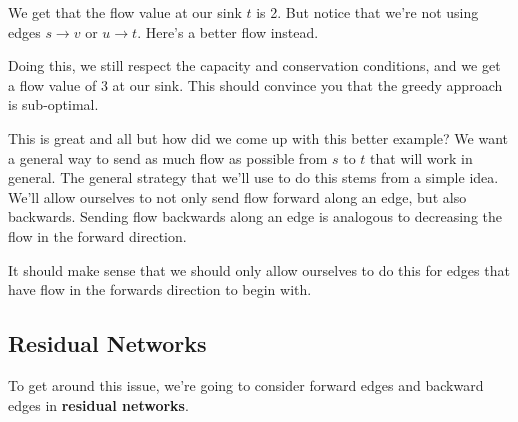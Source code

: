 \documentclass[12pt]{article}
\newcommand{\fc}[2]{
  \blue{#1}/\red{#2}
}
\begin{document}
  We get that the flow value at our sink $t$ is 2. But notice that we're not
  using edges $s \to v$ or $u \to t$. Here's a better flow instead.

  \begin{center}
  \end{center}

  Doing this, we still respect the capacity and conservation conditions, and
  we get a flow value of 3 at our sink. This should convince you that the greedy
  approach is sub-optimal.


  This is great and all but how did we come up with this better example?
  We want a general way to send as much flow as possible from $s$ to $t$ that
  will work in general. The general strategy that we'll use to do this stems
  from a simple idea. We'll allow ourselves to not only send flow forward along
  an edge, but also backwards. Sending flow backwards along an edge is analogous
  to decreasing the flow in the forward direction.

  It should make sense that we should only allow ourselves to do this for edges
  that have flow in the forwards direction to begin with.

  \subsection{Residual Networks}

  To get around this issue, we're going to consider forward edges and backward
  edges in {\bf residual networks}.
\end{document}
